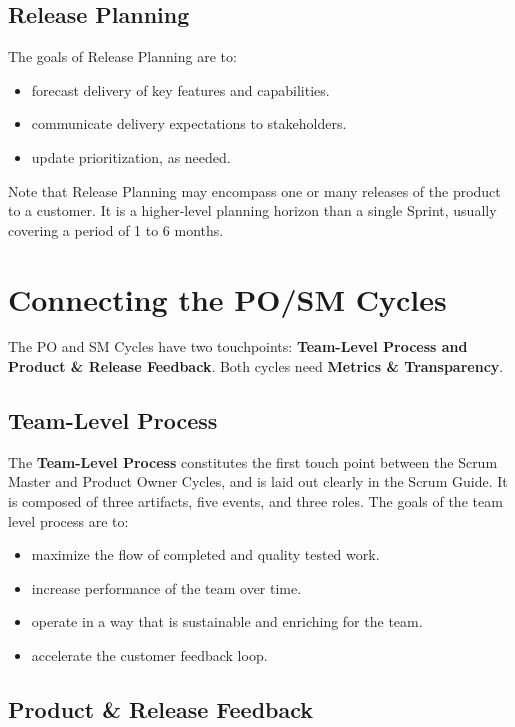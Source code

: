 \documentclass[12pt,a4paper,parskip=full]{scrartcl}
\begin{document}
\subsection{Release Planning}

The goals of Release Planning are to:

\begin{itemize}
	\item forecast delivery of key features and capabilities.
	\item communicate delivery expectations to stakeholders.
	\item update prioritization, as needed.
\end{itemize}

Note that Release Planning may encompass one or many releases of the product to a customer. It is a higher-level planning horizon than a single Sprint, usually covering a period of 1 to 6 months.

\section{Connecting the PO/SM Cycles}

The PO and SM Cycles have two touchpoints: \textbf{Team-Level Process and Product \& Release Feedback}. Both cycles need \textbf{Metrics \& Transparency}.

\subsection{Team-Level Process}

The \textbf{Team-Level Process} constitutes the first touch point between the Scrum Master and Product Owner Cycles, and is laid out clearly in the Scrum Guide. It is composed of three artifacts, five events, and three roles. The goals of the team level process are to:

\begin{itemize}
	\item maximize the flow of completed and quality tested work.
	\item increase performance of the team over time.
	\item operate in a way that is sustainable and enriching for the team.
	\item accelerate the customer feedback loop.
\end{itemize}

\subsection{Product \& Release Feedback}
\end{document}
